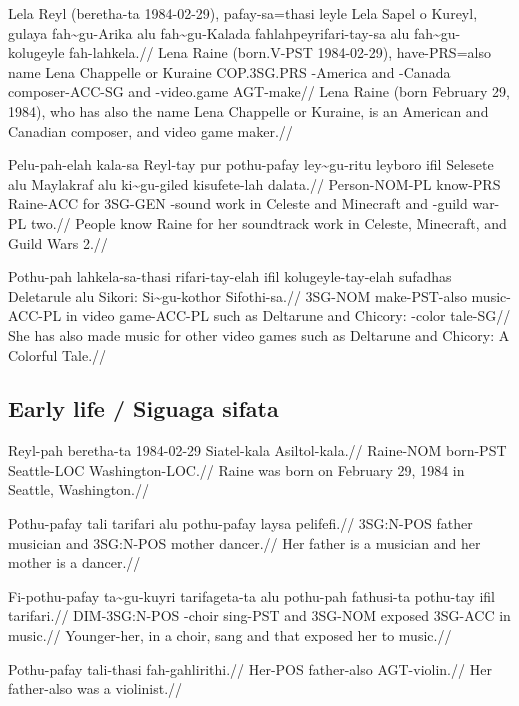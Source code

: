 \ex
\begingl
\gla  Lela Reyl (beretha-ta 1984-02-29), pafay-sa=thasi leyle Lela Sapel o Kureyl, gulaya fah\~{}gu-Arika alu fah\~{}gu-Kalada fahlahpeyrifari-tay-sa alu fah\~{}gu-kolugeyle fah-lahkela.//
\glb  Lena Raine (born.V-PST 1984-02-29), have-PRS=also name Lena Chappelle or Kuraine COP.3SG.PRS \agradj{}-America and \agradj{}-Canada composer-ACC-SG and \agradj{}-video.game AGT-make//
\glft Lena Raine (born February 29, 1984), who has also the name Lena Chappelle or Kuraine, is an American and Canadian composer, and video game maker.//
\endgl 
\xe

\ex
\begingl 
\gla  Pelu-pah-elah kala-sa Reyl-tay pur pothu-pafay ley\~{}gu-ritu leyboro ifil Selesete alu Maylakraf alu ki\~{}gu-giled kisufete-lah dalata.//
\glb  Person-NOM-PL know-PRS Raine-ACC for 3SG-GEN \agradj{}-sound work in Celeste and Minecraft and \agradj{}-guild war-PL two.//
\glft People know Raine for her soundtrack work in Celeste, {} Minecraft, and Guild Wars 2.//
\endgl 
\xe

\ex
\begingl
\gla  Pothu-pah lahkela-sa-thasi rifari-tay-elah ifil kolugeyle-tay-elah sufadhas Deletarule alu Sikori: Si\~{}gu-kothor Sifothi-sa.//
\glb  3SG-NOM make-PST-also music-ACC-PL in video game-ACC-PL such as Deltarune and Chicory: \agradj{}-color tale-SG//
\glft She has also made music for other video games such as Deltarune and Chicory: A Colorful Tale.//
\endgl 
\xe

\subsection{Early life / Siguaga sifata}

\ex
\begingl
\gla  Reyl-pah beretha-ta  1984-02-29  Siatel-kala Asiltol-kala.//
\glb  Raine-NOM born-PST    Seattle-LOC  Washington-LOC.//
\glft Raine was born on February 29, 1984 in Seattle, Washington.//
\endgl
\xe

\ex
\begingl
\gla  Pothu-pafay tali  tarifari alu pothu-pafay laysa  pelifefi.//
\glb  3SG:N-POS father musician and 3SG:N-POS mother dancer.//
\glft Her father is a musician and her mother is a dancer.//
\endgl
\xe

\ex
\begingl
\gla  Fi-pothu-pafay ta\~{}gu-kuyri tarifageta-ta alu pothu-pah fathusi-ta pothu-tay ifil tarifari.//
\glb  DIM-3SG:N-POS \agradj{}-choir sing-PST and 3SG-NOM exposed 3SG-ACC in music.//
\glft Younger-her, in a choir, sang and that exposed her to music.//
\endgl
\xe

\ex
\begingl
\gla  Pothu-pafay tali-thasi  fah-gahlirithi.//
\glb  Her-POS father-also AGT-violin.//
\glft Her father-also was a violinist.//
\endgl
\xe

